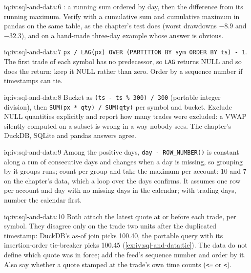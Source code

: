 \begin{solution}{iq:iv:sql-and-data:6}
: a running sum ordered by day, then the difference from its running maximum. Verify with a
cumulative sum and cumulative maximum in pandas on the same table, as the chapter's test does (worst drawdowns $-8.9$ and $-32.3$),
and on a hand-made three-day example whose answer is obvious.
\end{solution}

\begin{solution}{iq:iv:sql-and-data:7}
\texttt{px / LAG(px) OVER (PARTITION BY sym ORDER BY ts) - 1}. The first trade of each symbol has no predecessor, so \texttt{LAG}
returns NULL and so does the return; keep it NULL rather than zero. Order by a sequence number if timestamps can tie.
\end{solution}

\begin{solution}{iq:iv:sql-and-data:8}
Bucket as \texttt{(ts - ts \% 300) / 300} (portable integer division), then \texttt{SUM(px * qty) / SUM(qty)} per symbol and bucket.
Exclude NULL quantities explicitly and report how many trades were excluded: a VWAP silently computed on a subset is wrong in a way
nobody sees. The chapter's DuckDB, SQLite and pandas answers agree.
\end{solution}

\begin{solution}{iq:iv:sql-and-data:9}
Among the positive days, \texttt{day - ROW\_NUMBER()} is constant along a run of consecutive days and changes when a day is missing,
so grouping by it groups runs; count per group and take the maximum per account: 10 and 7 on the chapter's data, which a loop over
the days confirms. It assumes one row per account and day with no missing days in the calendar; with trading days, number the
calendar first.
\end{solution}

\begin{solution}{iq:iv:sql-and-data:10}
Both attach the latest quote at or before each trade, per symbol. They disagree only on the trade two units after the duplicated
timestamp: DuckDB's as-of join picks 100.40, the portable query with its insertion-order tie-breaker picks 100.45
(\cref{ex:iv:sql-and-data:tie}). The data do not define which quote was in force; add the feed's sequence number and order by it.
Also say whether a quote stamped at the trade's own time counts (\texttt{<=} or \texttt{<}).
\end{solution}

